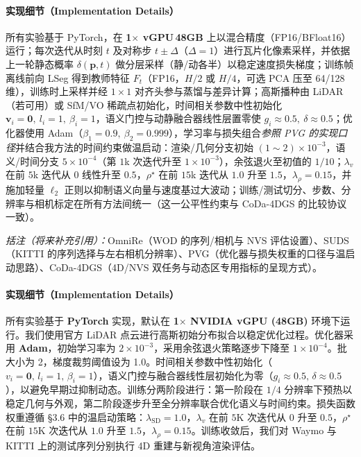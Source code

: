\documentclass[10pt,conference]{IEEEtran} %
\begin{document}
\paragraph{实现细节（Implementation Details）}
所有实验基于 PyTorch，在 \textbf{1\(\times\) vGPU\,48GB} 上以混合精度（FP16/BFloat16）运行；每次迭代从时刻 \(t\) 及对称步 \(t\pm\Delta\)（\(\Delta{=}1\)）进行瓦片化像素采样，并依据上一轮静态概率 \(\delta(\mathbf p,t)\) 做分层采样（静/动各半）以稳定速度损失梯度；训练帧离线前向 LSeg 得到教师特征 \(F_t\)（FP16，\(H/2\) 或 \(H/4\)，可选 PCA 压至 64/128 维），训练时上采样并经 \(1{\times}1\) 对齐头参与蒸馏与差异计算；高斯播种由 LiDAR（若可用）或 SfM/VO 稀疏点初始化，时间相关参数中性初始化 \(\bm v_i{=}\bm 0,\ l_i{=}1,\ \beta_i{=}1\)，语义门控与动静融合器线性层置零使 \(g_i\!\approx\!0.5,\ \delta\!\approx\!0.5\)；优化器使用 Adam（\(\beta_1{=}0.9,\ \beta_2{=}0.999\)），学习率与损失组合\emph{参照 PVG 的实现口径}并结合我方法的时间约束做温启动：渲染/几何分支初始 \((1\!\sim\!2)\times10^{-3}\)，语义/时间分支 \(5\times10^{-4}\)（第 \(1\)k 次迭代升至 \(1\times10^{-3}\)），余弦退火至初值的 \(1/10\)；\(\lambda_v\) 在前 \(5\)k 迭代从 \(0\) 线性升至 \(0.5\)，\(\rho^\star\) 在前 \(15\)k 迭代从 \(1.0\) 升至 \(1.5\)，\(\lambda_\rho{=}0.15\)，并施加轻量 \(\ell_2\) 正则以抑制语义向量与速度基过大波动；训练/测试切分、步数、分辨率与相机标定在所有方法间统一（这一公平性约束与 CoDa\mbox{-}4DGS 的比较协议一致）。

\vspace{2pt}
\noindent\textit{括注（将来补充引用）：}OmniRe（WOD 的序列/相机与 NVS 评估设置）、SUDS（KITTI 的序列选择与左右相机分辨率）、PVG（优化器与损失权重的口径与温启动思路）、CoDa\mbox{-}4DGS（4D/NVS 双任务与动态区专用指标的呈现方式）。

\paragraph{实现细节（Implementation Details）}
所有实验基于 \textbf{PyTorch} 实现，默认在 \textbf{1$\times$ NVIDIA vGPU (48GB)} 环境下运行。我们使用官方 LiDAR 点云进行高斯初始分布拟合以稳定优化过程。优化器采用 \textbf{Adam}，初始学习率为 $2\times10^{-3}$，采用余弦退火策略逐步下降至 $1\times10^{-4}$。批大小为 2，梯度裁剪阈值设为 1.0。时间相关参数中性初始化（$v_i{=}\mathbf{0},\,l_i{=}1,\,\beta_i{=}1$），语义门控与融合器线性层初始化为零（$g_i\!\approx\!0.5,\,\delta\!\approx\!0.5$），以避免早期过抑制动态。训练分两阶段进行：第一阶段在 $1/4$ 分辨率下预热以稳定几何与外观，第二阶段逐步升至全分辨率联合优化语义与时间约束。损失函数权重遵循 §3.6 中的温启动策略：$\lambda_{\mathrm{SD}}{=}1.0$，$\lambda_v$ 在前 $5$K 次迭代从 $0$ 升至 $0.5$，$\rho^\star$ 在前 $15$K 次迭代从 $1.0$ 升至 $1.5$，$\lambda_\rho{=}0.15$。训练收敛后，我们对 Waymo 与 KITTI 上的测试序列分别执行 4D 重建与新视角渲染评估。
\end{document}
